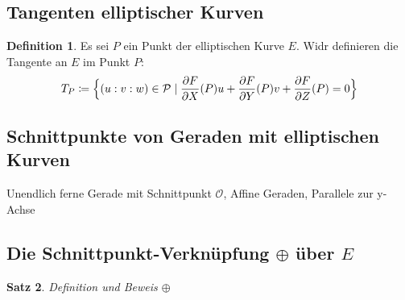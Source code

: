 \documentclass[hidelinks]{article}
\theoremstyle{plain}
\newtheorem{thm}{Satz}[section]
\theoremstyle{definition}
\newtheorem{defn}[thm]{Definition}
\theoremstyle{rem}
\newcommand{\patinf}{\mathcal{O}}
\begin{document}
\begin{sloppypar}
\subsection{Tangenten elliptischer Kurven}
\begin{defn}
	Es sei $P$ ein Punkt der elliptischen Kurve $E$. Widr definieren die Tangente an $E$ im Punkt $P$:
\begin{equation*}
	T_P\coloneqq\Bigl\{(u:v:w)\in\mathcal{P}\mid\frac{\partial F}{\partial X}(P)u+\frac{\partial F}{\partial Y}(P)v+\frac{\partial F}{\partial Z}(P)=0\Bigr\}
\end{equation*}
\end{defn}
\subsection{Schnittpunkte von Geraden mit elliptischen Kurven}
Unendlich ferne Gerade mit Schnittpunkt $\patinf$, Affine Geraden, Parallele zur y-Achse
\subsection{Die Schnittpunkt-Verknüpfung $\oplus $ über $E$}
\begin{thm} \label{oplus-op}
    Definition und Beweis $\oplus$
\end{thm}

\end{sloppypar}
\end{document}
